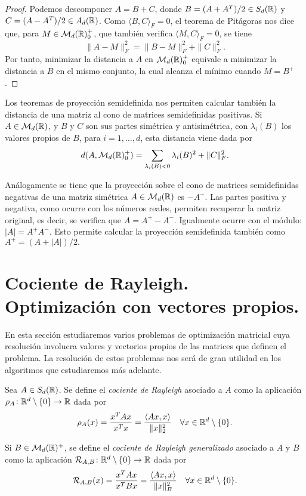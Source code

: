 \begin{proof}
    Podemos descomponer $A = B+C$, donde $B = (A+A^T)/2 \in S_d(\mathbb{R})$ y $C = (A - A^T)/2 \in A_d(\mathbb{R})$. Como $\langle B, C\rangle_F = 0$, el teorema de Pitágoras nos dice que, para $M \in \mathcal{M}_d(\mathbb{R})^+_0$, que también verifica $\langle M, C \rangle_F = 0$, se tiene
    \[ \|A - M\|_F^2 = \|B - M\|_F^2 + \|C\|_F^2. \]
    Por tanto, minimizar la distancia a $A$ en $\mathcal{M}_d(\mathbb{R})^+_0$ equivale a minimizar la distancia a $B$ en el mismo conjunto, la cual alcanza el mínimo cuando $M = B^+$.
\end{proof}

\begin{remark}
    Los teoremas de proyección semidefinida nos permiten calcular también la distancia de una matriz al cono de matrices semidefinidas positivas. Si $A \in \mathcal{M}_d(\mathbb{R})$, y $B$ y $C$ son sus partes simétrica y antisimétrica, con $\lambda_i(B)$ los valores propios de $B$, para $i = 1,\dots,d$, esta distancia viene dada por
    \[ d(A,\mathcal{M}_d(\mathbb{R})^+_0) = \sum_{\lambda_i(B) < 0} \lambda_i(B)^2 + \|C\|^2_F.  \]
\end{remark}

\begin{remark}
    Análogamente se tiene que la proyección sobre el cono de matrices semidefinidas negativas de una matriz simétrica $A \in \mathcal{M}_d(\mathbb{R})$ es $-A^-$. Las partes positiva y negativa, como ocurre con los números reales, permiten recuperar la matriz original, es decir, se verifica que $A = A^+ - A^-$. Igualmente ocurre con el módulo: $|A| = A^+ A^-$. Esto permite calcular la proyección semidefinida también como $A^+ = (A + |A|)/2.$
\end{remark}

\section{Cociente de Rayleigh. Optimización con vectores propios.}

En esta sección estudiaremos varios problemas de optimización matricial cuya resolución involucra valores y vectorios propios de las matrices que definen el problema. La resolución de estos problemas nos será de gran utilidad en los algoritmos que estudiaremos más adelante.

\begin{definition}
    Sea $A \in S_d(\mathbb{R})$. Se define el \emph{cociente de Rayleigh} asociado a $A$ como la aplicación $\rho_A \colon \mathbb{R}^d \setminus \{0\} \to \mathbb{R}$ dada por
    \[ \rho_A(x) = \frac{x^TAx}{x^Tx} = \frac{\langle Ax, x\rangle}{\|x\|_2^2} \quad \forall x \in \mathbb{R}^d \setminus\{0\}. \]

    Si $B \in \mathcal{M}_d(\mathbb{R})^+$, se define el \emph{cociente de Rayleigh generalizado} asociado a $A$ y $B$ como la aplicación $\mathcal{R}_{A,B} \colon \mathbb{R}^d \setminus \{0\}\to \mathbb{R}$ dada por
    \[ \mathcal{R}_{A,B}(x) = \frac{x^TAx}{x^TBx} = \frac{\langle Ax ,x \rangle}{\|x\|_B^2} \quad \forall x \in \mathbb{R}^d \setminus \{0\}.\]
\end{definition}


